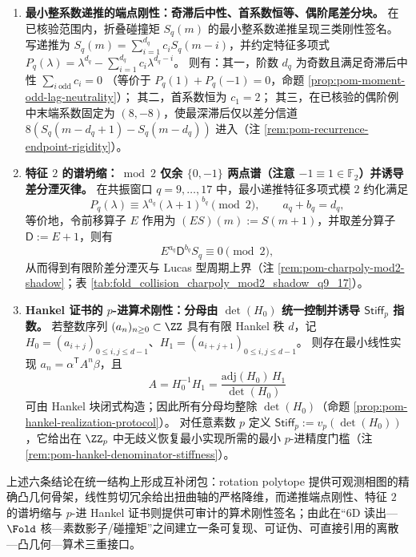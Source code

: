 \begin{theorem}
\begin{enumerate}
  \item \textbf{最小整系数递推的端点刚性：奇滞后中性、首系数恒等、偶阶尾差分块。}
  在已核验范围内，折叠碰撞矩 \(S_q(m)\) 的最小整系数递推呈现三类刚性签名。
  写递推为 \(S_q(m)=\sum_{i=1}^{d_q}c_iS_q(m-i)\)，并约定特征多项式 \(P_q(\lambda)=\lambda^{d_q}-\sum_{i=1}^{d_q}c_i\lambda^{d_q-i}\)。
  则有：其一，阶数 \(d_q\) 为奇数且满足奇滞后中性
  \(
  \sum_{i\ \mathrm{odd}}c_i=0
  \)
  （等价于 \(P_q(1)+P_q(-1)=0\)，命题 \ref{prop:pom-moment-odd-lag-neutrality}）；
  其二，首系数恒为 \(c_1=2\)；
  其三，在已核验的偶阶例中末端系数固定为 \((8,-8)\)，使最深滞后仅以差分信道 \(8(S_q(m-d_q+1)-S_q(m-d_q))\) 进入（注 \ref{rem:pom-recurrence-endpoint-rigidity}）。

  \item \textbf{特征 \(2\) 的谱坍缩：\(\bmod 2\) 仅余 \(\{0,-1\}\) 两点谱（注意 \(-1\equiv 1\in\mathbb{F}_2\)）并诱导差分湮灭律。}
  在共振窗口 \(q=9,\dots,17\) 中，最小递推特征多项式模 \(2\) 约化满足
  \[
  P_q(\lambda)\equiv \lambda^{a_q}(\lambda+1)^{b_q}\pmod 2,\qquad a_q+b_q=d_q,
  \]
  等价地，令前移算子 \(E\) 作用为 \((ES)(m):=S(m+1)\)，并取差分算子 \(\mathsf{D}:=E+1\)，则有
  \[
  E^{a_q}\mathsf{D}^{b_q}S_q\equiv 0\pmod 2,
  \]
  从而得到有限阶差分湮灭与 Lucas 型周期上界（注 \ref{rem:pom-charpoly-mod2-shadow}；表 \ref{tab:fold_collision_charpoly_mod2_shadow_q9_17}）。

  \item \textbf{Hankel 证书的 \(p\)-进算术刚性：分母由 \(\det(H_0)\) 统一控制并诱导 \(\mathsf{Stiff}_p\) 指数。}
  若整数序列 \((a_n)_{n\ge 0}\subset\ZZ\) 具有有限 Hankel 秩 \(d\)，记
  \(H_0=(a_{i+j})_{0\le i,j\le d-1}\)、\(H_1=(a_{i+j+1})_{0\le i,j\le d-1}\)。
  则存在最小线性实现 \(a_n=\alpha^{\mathsf T}A^n\beta\)，且
  \[
  A=H_0^{-1}H_1=\frac{\mathrm{adj}(H_0)\,H_1}{\det(H_0)}
  \]
  可由 Hankel 块闭式构造；因此所有分母均整除 \(\det(H_0)\)（命题 \ref{prop:pom-hankel-realization-protocol}）。
  对任意素数 \(p\) 定义
  \(
  \mathsf{Stiff}_p:=v_p(\det(H_0))
  \)，它给出在 \(\ZZ_p\) 中无歧义恢复最小实现所需的最小 \(p\)-进精度门槛（注 \ref{rem:pom-hankel-denominator-stiffness}）。
\end{enumerate}
上述六条结论在统一结构上形成互补闭包：rotation polytope 提供可观测相图的精确凸几何骨架，线性剪切冗余给出扭曲轴的严格降维，而递推端点刚性、特征 \(2\) 的谱坍缩与 \(p\)-进 Hankel 证书则提供可审计的算术刚性签名；由此在“6D 读出—\(\Fold\) 核—素数影子/碰撞矩”之间建立一条可复现、可证伪、可直接引用的离散—凸几何—算术三重接口。
\end{theorem}

